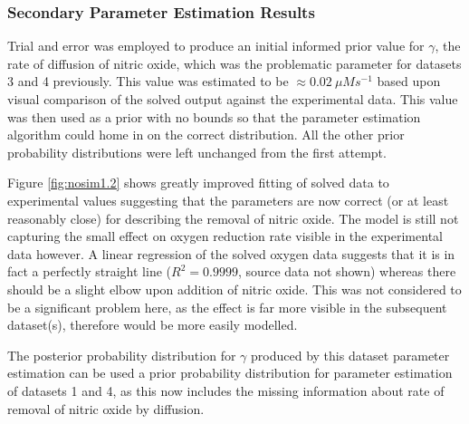 \subsubsection{Secondary Parameter Estimation Results}
Trial and error was employed to produce an initial informed prior value for $\gamma$, the rate of diffusion of nitric oxide, which was the problematic parameter for datasets 3 and 4 previously. This value was estimated to be $\approx 0.02~\mu Ms^{-1}$ based upon visual comparison of the solved output against the experimental data. This value was then used as a prior with no bounds so that the parameter estimation algorithm could home in on the correct distribution. All the other prior probability distributions were left unchanged from the first attempt.

Figure \ref{fig:nosim1.2} shows greatly improved fitting of solved data to experimental values suggesting that the parameters are now correct (or at least reasonably close) for describing the removal of nitric oxide. The model is still not capturing the small effect on oxygen reduction rate visible in the experimental data however. A linear regression of the solved oxygen data suggests that it is in fact a perfectly straight line ($R^2=0.9999$, source data not shown) whereas there should be a slight elbow upon addition of nitric oxide. This was not considered to be a significant problem here, as the effect is far more visible in the subsequent dataset(s), therefore would be more easily modelled.

The posterior probability distribution for $\gamma$ produced by this dataset parameter estimation can be used a prior probability distribution for parameter estimation of datasets 1 and 4, as this now includes the missing information about rate of removal of nitric oxide by diffusion.


